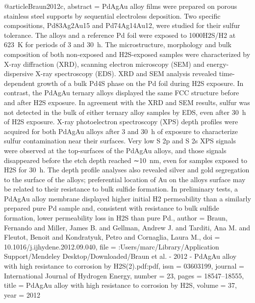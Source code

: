 @article{Braun2012c,
abstract = {PdAgAu alloy films were prepared on porous stainless steel supports by sequential electroless deposition. Two specific compositions, Pd83Ag2Au15 and Pd74Ag14Au12, were studied for their sulfur tolerance. The alloys and a reference Pd foil were exposed to 1000H2S/H2 at 623 K for periods of 3 and 30 h. The microstructure, morphology and bulk composition of both non-exposed and H2S-exposed samples were characterized by X-ray diffraction (XRD), scanning electron microscopy (SEM) and energy-dispersive X-ray spectroscopy (EDS). XRD and SEM analysis revealed time-dependent growth of a bulk Pd4S phase on the Pd foil during H2S exposure. In contrast, the PdAgAu ternary alloys displayed the same FCC structure before and after H2S exposure. In agreement with the XRD and SEM results, sulfur was not detected in the bulk of either ternary alloy samples by EDS, even after 30 h of H2S exposure. X-ray photoelectron spectroscopy (XPS) depth profiles were acquired for both PdAgAu alloys after 3 and 30 h of exposure to characterize sulfur contamination near their surfaces. Very low S 2p and S 2s XPS signals were observed at the top-surfaces of the PdAgAu alloys, and those signals disappeared before the etch depth reached ∼10 nm, even for samples exposed to H2S for 30 h. The depth profile analyses also revealed silver and gold segregation to the surface of the alloys; preferential location of Au on the alloys surface may be related to their resistance to bulk sulfide formation. In preliminary tests, a PdAgAu alloy membrane displayed higher initial H2 permeability than a similarly prepared pure Pd sample and, consistent with resistance to bulk sulfide formation, lower permeability loss in H2S than pure Pd.},
author = {Braun, Fernando and Miller, James B. and Gellman, Andrew J. and Tarditi, Ana M. and Fleutot, Benoit and Kondratyuk, Petro and Cornaglia, Laura M.},
doi = {10.1016/j.ijhydene.2012.09.040},
file = {:Users/marc/Library/Application Support/Mendeley Desktop/Downloaded/Braun et al. - 2012 - PdAgAu alloy with high resistance to corrosion by H2S(2).pdf:pdf},
issn = {03603199},
journal = {International Journal of Hydrogen Energy},
number = {23},
pages = {18547--18555},
title = {{PdAgAu alloy with high resistance to corrosion by H2S}},
volume = {37},
year = {2012}
}
